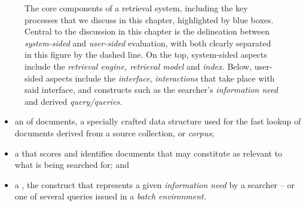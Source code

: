 \begin{figure}[t!]
    \centering
    \caption[Basics of an experimental retrieval system]{The core components of a retrieval system, including the key processes that we discuss in this chapter, highlighted by blue boxes. Central to the discussion in this chapter is the delineation between \emph{system-sided} and \emph{user-sided} evaluation, with both clearly separated in this figure by the dashed line. On the top, system-sided aspects include the \emph{retrieval engine, retrieval model} and \emph{index.} Below, user-sided aspects include the \emph{interface}, \emph{interactions} that take place with said interface, and constructs such as the searcher's \emph{information need} and derived \emph{query/queries.}}
    \label{fig:irs}
\end{figure}

\begin{itemize}
    \item{an  of documents, a specially crafted data structure used for the fast lookup of documents derived from a source collection, or \emph{corpus};}
    \item{a  that scores and identifies documents that may constitute as relevant to what is being searched for; and}
    \item{a , the construct that represents a given \emph{information need} by a searcher -- or one of several queries issued in a \emph{batch environment.}}
\end{itemize}

